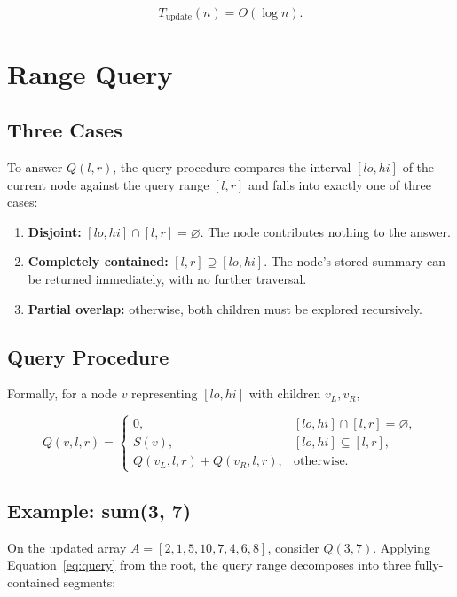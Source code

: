 \documentclass[11pt]{scrartcl}
\begin{document}
\begin{equation}
\boxed{T_{\text{update}}(n) = O(\log n)}.
\end{equation}

\section{Range Query}

\subsection{Three Cases}
To answer $Q(l,r)$, the query procedure compares the interval $[lo,hi]$ of the current node against the query range $[l,r]$ and falls into exactly one of three cases:

\begin{enumerate}[nosep]
  \item \textbf{Disjoint:} $[lo,hi] \cap [l,r] = \varnothing$. The node contributes nothing to the answer.
  \item \textbf{Completely contained:} $[l,r] \supseteq [lo,hi]$. The node's stored summary can be returned immediately, with no further traversal.
  \item \textbf{Partial overlap:} otherwise, both children must be explored recursively.
\end{enumerate}

\subsection{Query Procedure}
Formally, for a node $v$ representing $[lo,hi]$ with children $v_L, v_R$,

\begin{equation}
Q(v,l,r) =
\begin{cases}
0, & [lo,hi] \cap [l,r] = \varnothing, \\[4pt]
S(v), & [lo,hi] \subseteq [l,r], \\[4pt]
Q(v_L,l,r) + Q(v_R,l,r), & \text{otherwise.}
\end{cases}
\label{eq:query}
\end{equation}

\subsection{Example: sum(3, 7)}
On the updated array $A = [2,1,5,10,7,4,6,8]$, consider $Q(3,7)$. Applying Equation~\eqref{eq:query} from the root, the query range decomposes into three fully-contained segments:
\end{document}
